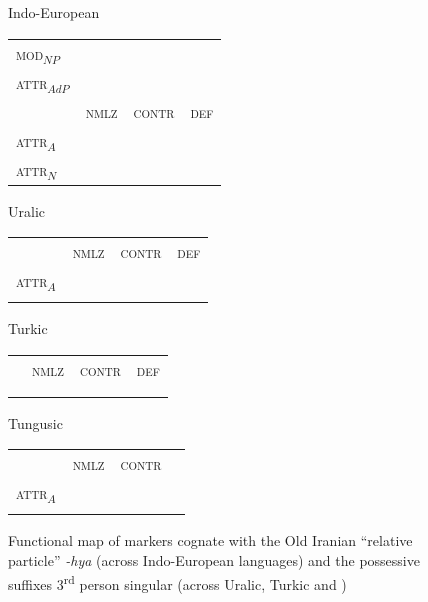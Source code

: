 {\begin{figure}
\parbox[b]{0.5\textwidth}{
\begin{center}Indo-European\\
\medskip
\begin{tabular}{| m{1.4cm} || m{.9cm} | m{1.1cm} | m{.7cm} |}
\cline{1-1}
\textsc{mod}$_{NP}$\\
\cline{1-1}
\textsc{attr}$_{AdP}$\\
\hline
 & \textsc{nmlz} & \textsc{contr} & \textsc{def}\\
\hline
\textsc{attr}$_{A}$\\
\cline{1-1}
\textsc{attr}$_{N}$\\
\cline{1-1}
\end{tabular}
\end{center}
}
\parbox[b]{0.5\textwidth}{
\begin{center}Uralic\\
\medskip
\begin{tabular}{| m{1.4cm} || m{.9cm} | m{1.1cm} | m{.7cm} |}
\cline{1-1}
\\
\cline{1-1}
\\
\hline
 & \textsc{nmlz} & \textsc{contr} & \textsc{def}\\
\hline
\textsc{attr}$_{A}$\\
\cline{1-1}
\\
\cline{1-1}
\end{tabular}
\end{center}
}

\parbox[b]{0.5\textwidth}{
\begin{center}Turkic\\
\medskip
\begin{tabular}{| m{1.4cm} || m{.9cm} | m{1.1cm} | m{.7cm} |}
\cline{1-1}
\\
\cline{1-1}
\\
\hline
 & \textsc{nmlz} & \textsc{contr} & \textsc{def}\\
\hline
\\
\cline{1-1}
\\
\cline{1-1}
\end{tabular}
\end{center}
}
\parbox[b]{0.5\textwidth}{
\begin{center}Tungusic\\
\medskip
\begin{tabular}{| m{1.4cm} || m{.9cm} | m{1.1cm} | m{.7cm} |}
\cline{1-1}
\\
\cline{1-1}
\\
\hline
 & \textsc{nmlz} & \textsc{contr} & \\
\hline
\textsc{attr}$_{A}$\\
\cline{1-1}
\\
\cline{1-1}
\end{tabular}
\end{center}
}
\caption[Functional map of cognate devices]{Functional map of markers cognate with the Old Iranian “relative particle” \textit{-hya} (across Indo-European languages) and the possessive suffixes 3\textsuperscript{rd} person singular (across Uralic, Turkic and )}
\label{ie-ural funcmap}
\end{figure}

}
